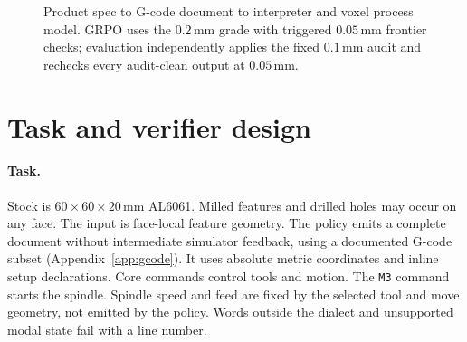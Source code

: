 \documentclass{article}
\begin{document}
\begin{figure}[t]
  \centering
  \footnotesize
  \caption{Product spec to G-code document to interpreter and voxel
  process model.  GRPO uses the $0.2$\,mm grade with triggered
  $0.05$\,mm frontier checks; evaluation independently applies the
  fixed $0.1$\,mm audit and rechecks every audit-clean output at
  $0.05$\,mm.}
  \label{fig:system}
\end{figure}

\section{Task and verifier design}
\label{sec:method}

\paragraph{Task.}
Stock is $60\times60\times20$\,mm AL6061.  Milled features and drilled
holes may occur on any face.  The input is face-local feature
geometry. The policy emits a complete document without intermediate
simulator feedback, using a documented G-code subset
(Appendix~\ref{app:gcode}).  It uses absolute metric coordinates and
inline setup declarations.  Core commands control tools and motion.
The \verb+M3+ command starts the spindle.  Spindle speed and feed are fixed by the selected
tool and move geometry, not emitted by the policy.  Words outside the
dialect and unsupported modal state fail with a line number.
\end{document}
